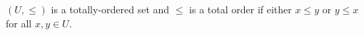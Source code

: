 $(U, \leq)$ is a totally-ordered set and $\leq$ is a total order if either $x \leq y$ or $y \leq x$ for all $x, y \in U$.
